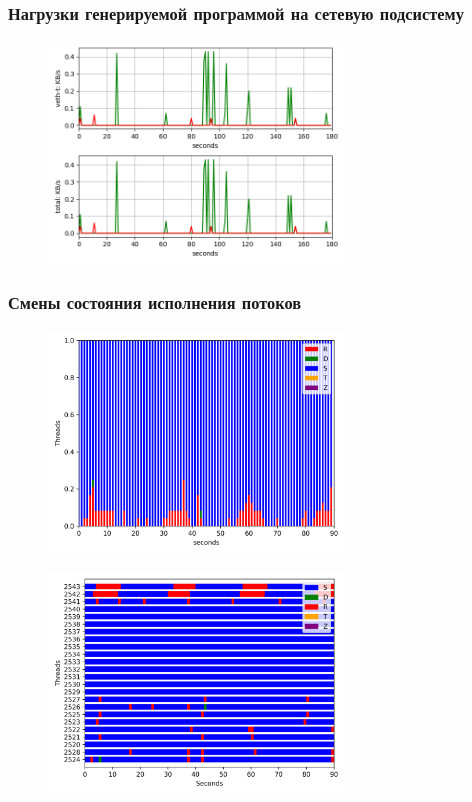 \documentclass[11pt, a4paper]{article}
\begin{document}
\newpage

\subsubsection*{Нагрузки генерируемой программой на сетевую подсистему}

\begin{figure}[h]
  \centering
  \includegraphics[width=0.7\textwidth]{fig-net.png}
\end{figure}

\subsubsection*{Смены состояния исполнения потоков}

\begin{figure}[h]
  \centering
  \includegraphics[width=0.7\textwidth]{fig-state.png}
\end{figure}

\begin{figure}[h]
  \centering
  \includegraphics[width=0.7\textwidth]{fig-state-vert.png}
\end{figure}
\end{document}
